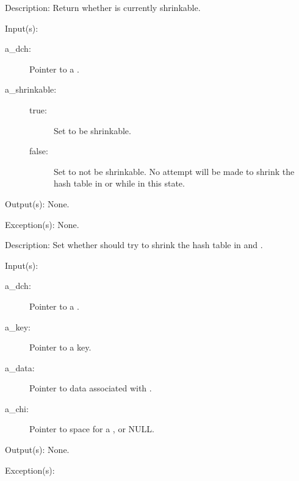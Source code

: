 \begin{capi}
\begin{capilist}
	\item[Description: ]
		Return whether  is currently shrinkable.
	\end{capilist}
\label{dch_shrinkable_set}
	\begin{capilist}
	\item[Input(s): ]
		\begin{description}\item[]
		\item[a\_dch: ]
			Pointer to a .
		\item[a\_shrinkable: ]
			\begin{description}\item[]
			\item[true: ] Set  to be shrinkable.
			\item[false: ] Set  to not be shrinkable.
				No attempt will be made to shrink the hash table
				in  or
				 while in this
				state.
			\end{description}
		\end{description}
	\item[Output(s): ] None.
	\item[Exception(s): ] None.
	\item[Description: ]
		Set whether  should try to shrink the hash table in
		 and .
	\end{capilist}
\label{dch_insert}
	\begin{capilist}
	\item[Input(s): ]
		\begin{description}\item[]
		\item[a\_dch: ]
			Pointer to a \classname{dch}.
		\item[a\_key: ]
			Pointer to a key.
		\item[a\_data: ]
			Pointer to data associated with \cvar{a\_key}.
		\item[a\_chi: ]
			Pointer to space for a , or NULL.
		\end{description}
	\item[Output(s): ] None.
	\item[Exception(s): ]

\end{capilist}
\end{capi}
